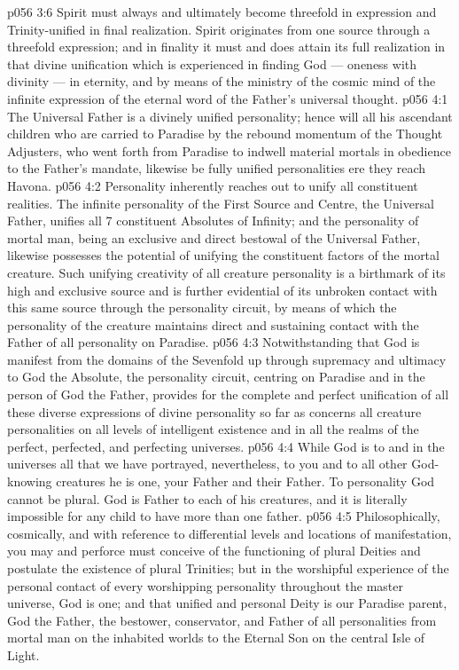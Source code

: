 \vs p056 3:6 Spirit must always and ultimately become threefold in expression and Trinity\hyp{}unified in final realization. Spirit originates from one source through a threefold expression; and in finality it must and does attain its full realization in that divine unification which is experienced in finding God --- oneness with divinity --- in eternity, and by means of the ministry of the cosmic mind of the infinite expression of the eternal word of the Father’s universal thought.
\vs p056 4:1 The Universal Father is a divinely unified personality; hence will all his ascendant children who are carried to Paradise by the rebound momentum of the Thought Adjusters, who went forth from Paradise to indwell material mortals in obedience to the Father’s mandate, likewise be fully unified personalities ere they reach Havona.
\vs p056 4:2 Personality inherently reaches out to unify all constituent realities. The infinite personality of the First Source and Centre, the Universal Father, unifies all 7 constituent Absolutes of Infinity; and the personality of mortal man, being an exclusive and direct bestowal of the Universal Father, likewise possesses the potential of unifying the constituent factors of the mortal creature. Such unifying creativity of all creature personality is a birthmark of its high and exclusive source and is further evidential of its unbroken contact with this same source through the personality circuit, by means of which the personality of the creature maintains direct and sustaining contact with the Father of all personality on Paradise.
\vs p056 4:3 Notwithstanding that God is manifest from the domains of the Sevenfold up through supremacy and ultimacy to God the Absolute, the personality circuit, centring on Paradise and in the person of God the Father, provides for the complete and perfect unification of all these diverse expressions of divine personality so far as concerns all creature personalities on all levels of intelligent existence and in all the realms of the perfect, perfected, and perfecting universes.
\vs p056 4:4 \pc While God is to and in the universes all that we have portrayed, nevertheless, to you and to all other God\hyp{}knowing creatures he is one, your Father and their Father. To personality God cannot be plural. God is Father to each of his creatures, and it is literally impossible for any child to have more than one father.
\vs p056 4:5 Philosophically, cosmically, and with reference to differential levels and locations of manifestation, you may and perforce must conceive of the functioning of plural Deities and postulate the existence of plural Trinities; but in the worshipful experience of the personal contact of every worshipping personality throughout the master universe, God is one; and that unified and personal Deity is our Paradise parent, God the Father, the bestower, conservator, and Father of all personalities from mortal man on the inhabited worlds to the Eternal Son on the central Isle of Light.
